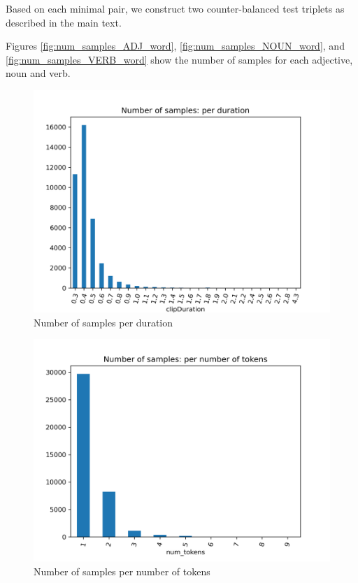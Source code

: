 Based on each minimal pair, we construct two counter-balanced test triplets as described in the main text.

Figures \ref{fig:num_samples_ADJ_word}, \ref{fig:num_samples_NOUN_word}, and \ref{fig:num_samples_VERB_word} show the number of samples for each adjective, noun and verb.


\begin{figure}
  \centering
  \includegraphics[width=\textwidth]{results/targeted_triplets/num_samples_vs_duration.png}
  \caption{Number of samples per duration}
  \label{fig:num_samples_vs_duration}
\end{figure}


\begin{figure}
  \centering
  \includegraphics[width=\textwidth]{results/targeted_triplets/num_samples_vs_num_tokens.png}
  \caption{Number of samples per number of tokens}
  \label{fig:num_samples_vs_num_tokens}
\end{figure}


